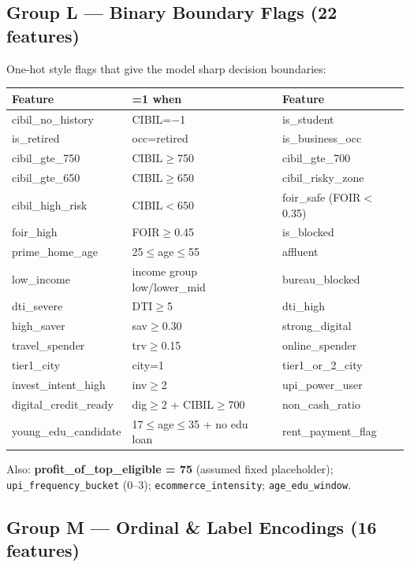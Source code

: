 \documentclass[12pt,a4paper]{article}
\begin{document}
\subsection{Group L — Binary Boundary Flags (22 features)}

One-hot style flags that give the model sharp decision boundaries:

\begin{tabular}{lll}
\toprule
\textbf{Feature} & \textbf{=1 when} & \textbf{Feature} \\
\midrule
cibil\_no\_history  & CIBIL=$-$1         & is\_student \\
is\_retired         & occ=retired        & is\_business\_occ \\
cibil\_gte\_750     & CIBIL$\geq$750     & cibil\_gte\_700 \\
cibil\_gte\_650     & CIBIL$\geq$650     & cibil\_risky\_zone \\
cibil\_high\_risk   & CIBIL$<$650        & foir\_safe (FOIR$<$0.35) \\
foir\_high          & FOIR$\geq$0.45     & is\_blocked \\
prime\_home\_age    & 25$\leq$age$\leq$55 & affluent \\
low\_income         & income group low/lower\_mid & bureau\_blocked \\
dti\_severe         & DTI$\geq$5         & dti\_high \\
high\_saver         & sav$\geq$0.30      & strong\_digital \\
travel\_spender     & trv$\geq$0.15      & online\_spender \\
tier1\_city         & city=1             & tier1\_or\_2\_city \\
invest\_intent\_high & inv$\geq$2        & upi\_power\_user \\
digital\_credit\_ready & dig$\geq$2 + CIBIL$\geq$700 & non\_cash\_ratio \\
young\_edu\_candidate & 17$\leq$age$\leq$35 + no edu loan & rent\_payment\_flag \\
\bottomrule
\end{tabular}

Also: \textbf{profit\_of\_top\_eligible = 75} (assumed fixed placeholder); \texttt{upi\_frequency\_bucket} (0--3); \texttt{ecommerce\_intensity}; \texttt{age\_edu\_window}.

\subsection{Group M — Ordinal \& Label Encodings (16 features)}
\end{document}
